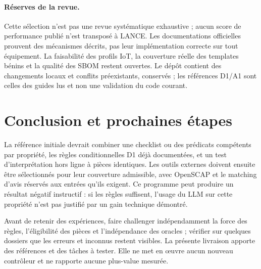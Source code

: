 \documentclass[11pt,a4paper]{article}
\begin{document}
\paragraph{Réserves de la revue.}
Cette sélection n'est pas une revue systématique exhaustive ; aucun score de performance publié n'est transposé à LANCE. Les documentations officielles prouvent des mécanismes décrits, pas leur implémentation correcte sur tout équipement. La faisabilité des profils IoT, la couverture réelle des templates bénins et la qualité des SBOM restent ouvertes. Le dépôt contient des changements locaux et conflits préexistants, conservés ; les références D1/A1 sont celles des guides lus et non une validation du code courant.

\section{Conclusion et prochaines étapes}
La référence initiale devrait combiner une checklist ou des prédicats compétents par propriété, les règles conditionnelles D1 déjà documentées, et un test d'interprétation hors ligne à pièces identiques. Les outils externes doivent ensuite être sélectionnés pour leur couverture admissible, avec OpenSCAP et le matching d'avis réservés aux entrées qu'ils exigent. Ce programme peut produire un résultat négatif instructif : si les règles suffisent, l'usage du LLM sur cette propriété n'est pas justifié par un gain technique démontré.

Avant de retenir des expériences, faire challenger indépendamment la force des règles, l'éligibilité des pièces et l'indépendance des oracles ; vérifier sur quelques dossiers que les erreurs et inconnus restent visibles. La présente livraison apporte des références et des tâches à tester. Elle ne met en œuvre aucun nouveau contrôleur et ne rapporte aucune plus-value mesurée.
\end{document}
